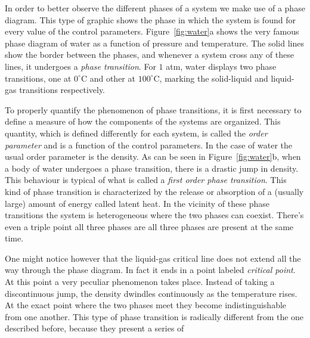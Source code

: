 In order to better observe the different phases of a system we make use of a
phase diagram. This type of graphic shows the phase in which the system is
found for every value of the control parameters. Figure~\ref{fig:water}a shows
the very famous phase diagram of water as a function of pressure and
temperature. The solid lines show the border between the phases, and whenever a
system cross any of these lines, it undergoes a \textit{phase transition}.
For $1$ atm, water displays two phase transitions, one at $0^\circ$C and
other at $100^\circ$C, marking the solid-liquid and liquid-gas transitions
respectively.

To properly quantify the phenomenon of phase transitions, it is first necessary
to define a measure of how the components of the systems are organized. This
quantity, which is defined differently for each system, is called the
\textit{order parameter} and is a function of the control parameters. In the
case of water the usual order parameter is the density. As can be seen in
Figure~\ref{fig:water}b, when a body of water undergoes a phase transition,
there is a drastic jump in density. This behaviour is typical of what is called
a \textit{first order phase transition}. This kind of phase transition is
characterized by the release or absorption of a (usually large) amount of
energy called latent heat. In the vicinity of these phase transitions the system
is heterogeneous where the two phases can coexist. There's even a triple point
all three phases are all three phases are present at the same time.

One might notice however that the liquid-gas critical line does not extend all
the way through the phase diagram. In fact it ends in a point labeled
\textit{critical point}. At this point a very peculiar phenomenon takes place.
Instead of taking a discontinuous jump, the density dwindles continuously as
the temperature rises. At the exact point where the two phases meet they become
indistinguishable from one another. This type of phase transition is radically
different from the one described before, because they present a series of


